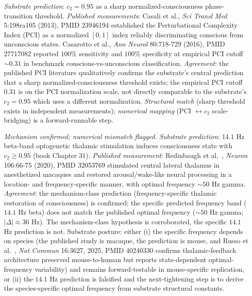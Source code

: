 \documentclass[11pt,a4paper]{amsart}
\theoremstyle{plain}
\theoremstyle{definition}
\begin{document}
\begin{description}[font=\normalfont\bfseries,leftmargin=2em,itemsep=6pt]
\item[Match 9 --- Casali 2013 / Casarotto 2016 brain-complexity sharp-threshold.]
\emph{Substrate prediction}: $c_2 = 0.95$ as a sharp normalized-consciousness phase-transition threshold. \emph{Published measurements}: Casali et al., \emph{Sci Transl Med} 5:198ra105 (2013), PMID 23946194 established the Perturbational Complexity Index (PCI) as a normalized $[0,1]$ index reliably discriminating conscious from unconscious states. Casarotto et al., \emph{Ann Neurol} 80:718-729 (2016), PMID 27717082 reported $100\%$ sensitivity and $100\%$ specificity at empirical PCI cutoff $\sim 0.31$ in benchmark conscious-vs-unconscious classification. \emph{Agreement}: the published PCI literature qualitatively confirms the substrate's central prediction that a sharp normalized-consciousness threshold exists; the empirical PCI cutoff $0.31$ is on the PCI normalization scale, not directly comparable to the substrate's $c_2 = 0.95$ which uses a different normalization. \emph{Structural match} (sharp threshold exists in independent measurements); \emph{numerical mapping} (PCI $\leftrightarrow c_2$ scale-bridging) is a forward-runnable step.

\item[Match 10 --- Redinbaugh 2020 frequency-specific thalamic restoration.] \emph{Mechanism confirmed; numerical mismatch flagged.}
\emph{Substrate prediction}: $14.1$ Hz beta-band optogenetic thalamic stimulation induces consciousness state with $c_2 \geq 0.95$ (book Chapter 31). \emph{Published measurement}: Redinbaugh et al.~\cite{redinbaugh-thalamus-2020}, \emph{Neuron} 106:66-75 (2020), PMID 32053769 stimulated central lateral thalamus in anesthetized macaques and restored arousal/wake-like neural processing in a location- and frequency-specific manner, with optimal frequency $\sim 50$ Hz gamma. \emph{Agreement}: the mechanism-class prediction (frequency-specific thalamic restoration of consciousness) is confirmed; the specific predicted frequency band ($14.1$ Hz beta) does not match the published optimal frequency ($\sim 50$ Hz gamma; $|\Delta| \approx 36$ Hz). The mechanism-class hypothesis is corroborated, the specific $14.1$ Hz prediction is not. Substrate posture: either (i) the specific frequency depends on species (the published study is macaque, the prediction is mouse, and Russo et al.~\cite{russo-thalamus-2025}, \emph{Nat Commun} 16:3627, 2025, PMID 40240330 confirms thalamic-feedback architecture preserved mouse-to-human but reports state-dependent optimal-frequency variability) and remains forward-testable in mouse-specific replication, or (ii) the $14.1$ Hz prediction is falsified and the next-tightening step is to derive the species-specific optimal frequency from substrate structural constants.


\end{description}
\end{document}
